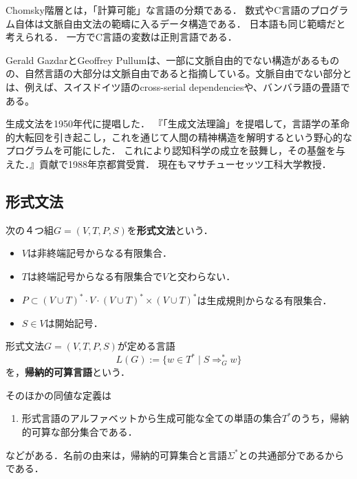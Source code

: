 \begin{tcolorbox}[colframe=ForestGreen, colback=ForestGreen!10!white, breakable]
    Chomsky階層とは，「計算可能」な言語の分類である．
    数式やC言語のプログラム自体は文脈自由文法の範疇に入るデータ構造である．
    日本語も同じ範疇だと考えられる．
    一方でC言語の変数は正則言語である．
\end{tcolorbox}
\begin{remark}
    Gerald GazdarとGeoffrey Pullumは、一部に文脈自由的でない構造があるものの、自然言語の大部分は文脈自由であると指摘している\cite{Pullum, Geoffrey}。文脈自由でない部分とは、例えば、スイスドイツ語のcross-serial dependencies\cite{Shieber, Stuart}や、バンバラ語の畳語である\cite{Culy, Christopher}。
\end{remark}

\begin{history}
    生成文法を1950年代に提唱した．
    『「生成文法理論」を提唱して，言語学の革命的大転回を引き起こし，これを通じて人間の精神構造を解明するという野心的なプログラムを可能にした．
    これにより認知科学の成立を鼓舞し，その基盤を与えた．』貢献で1988年京都賞受賞．
    現在もマサチューセッツ工科大学教授．
\end{history}

\subsection{形式文法}

\begin{definition}
    次の４つ組$G=(V,T,P,S)$を\textbf{形式文法}という．
    \begin{itemize}
        \item $V$は非終端記号からなる有限集合．
        \item $T$は終端記号からなる有限集合で$V$と交わらない．
        \item $P\subset (V\cup T)^*\cdot V\cdot (V\cup T)^*\times (V\cup T)^*$は生成規則からなる有限集合．
        \item $S\in V$は開始記号．
    \end{itemize}
\end{definition}

\begin{definition}
    形式文法$G=(V,T,P,S)$が定める言語
    \[L(G):=\{w\in T^*\mid S\Rightarrow_G^*w\}\]
    を，\textbf{帰納的可算言語}という．
\end{definition}
\begin{remark}
    そのほかの同値な定義は
    \begin{enumerate}
        \item 形式言語のアルファベットから生成可能な全ての単語の集合$T^*$のうち，帰納的可算な部分集合である．
    \end{enumerate}
    などがある．名前の由来は，帰納的可算集合と言語$\Sigma^*$との共通部分であるからである．
\end{remark}

